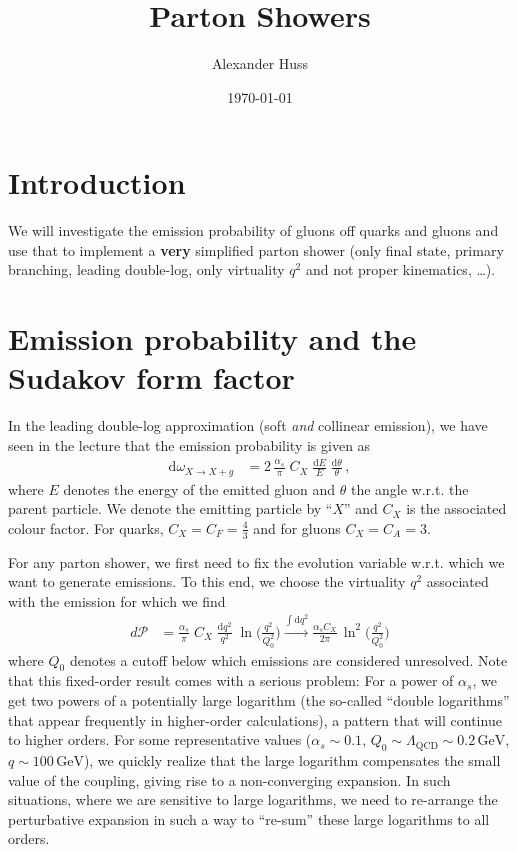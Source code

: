 \documentclass[11pt]{article}
\author{Alexander Huss}
\date{\today}
\title{Parton Showers}
\begin{document}
\maketitle
\tableofcontents



\section{Introduction}
\label{sec:orgd63bd54}
We will investigate the emission probability of gluons off quarks and gluons and use that to implement a \textbf{very} simplified parton shower (only final state, primary branching, leading double-log, only virtuality \(q^2\) and not proper kinematics, \ldots{}).

\section{Emission probability and the Sudakov form factor}
\label{sec:org0794b70}
In the leading double-log approximation (soft \emph{and} collinear emission), we have seen in the lecture that the emission probability is given as
\begin{align}
  \mathrm{d}\omega_{X\to X+g}
  &=
  2 \, \frac{\alpha_s}{\pi}\; C_X \; \frac{\mathrm{d}E}{E} \; \frac{\mathrm{d}\theta}{\theta}
  \,,
\end{align}
where \(E\) denotes the energy of the emitted gluon and \(\theta\) the angle w.r.t. the parent particle.
We denote the emitting particle by ``\(X\)'' and \(C_X\) is the associated colour factor.
For quarks, \(C_X=C_F=\tfrac{4}{3}\) and for gluons \(C_X=C_A=3\).

For any parton shower, we first need to fix the evolution variable w.r.t. which we want to generate emissions.
To this end, we choose the virtuality \(q^2\) associated with the emission for which we find
\begin{align}
  d\mathcal{P}
  &=
  \frac{\alpha_s}{\pi}\; C_X \; \frac{\mathrm{d}q^2}{q^2} \; \ln\biggl(\frac{q^2}{Q_0^2}\biggr)
  \xrightarrow{\int\mathrm{d}q^2}
  \frac{\alpha_s C_X}{2\pi} \, \ln^2\biggl(\frac{q^2}{Q_0^2}\biggr)
\end{align}
where \(Q_0\) denotes a cutoff below which emissions are considered unresolved.
Note that this fixed-order result comes with a serious problem: For a power of \(\alpha_s\), we get two powers of a potentially large logarithm (the so-called ``double logarithms'' that appear frequently in higher-order calculations), a pattern that will continue to higher orders.
For some representative values (\(\alpha_s \sim 0.1\), \(Q_0 \sim \Lambda_\mathrm{QCD} \sim 0.2\,\mathrm{GeV}\), \(q\sim 100\,\mathrm{GeV}\)), we quickly realize that the large logarithm compensates the small value of the coupling, giving rise to a non-converging expansion.
In such situations, where we are sensitive to large logarithms, we need to re-arrange the perturbative expansion in such a way to ``re-sum'' these large logarithms to all orders.
\end{document}
